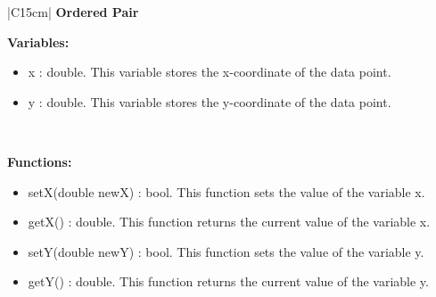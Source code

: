 \documentclass[letterpaper,english, 12pt]{scrreprt}
\begin{document}
\begin{center}
	\begin{tabular}{|C{15cm}|}
		\hline
			\textbf{Ordered Pair} \\
		\hline
			\begin{flushleft}
				\textbf{Variables: }\\
			\end{flushleft}
				\begin{itemize}
					\item x : double. This variable stores the x-coordinate of the data point.
					\item y : double. This variable stores the y-coordinate of the data point.
				\end{itemize} \\
			\hline
			\begin{flushleft}
				\textbf{Functions: } \\
			\end{flushleft}
				\begin{itemize}
					\item setX(double newX) : bool. This function sets the value of the variable x.
					\item getX() : double. This function returns the current value of the variable x.
					\item setY(double newY) : bool. This function sets the value of the variable y.
					\item getY() : double. This function returns the current value of the variable y.
				\end{itemize} \\
			\hline
	\end{tabular}
\end{center}
\end{document}
